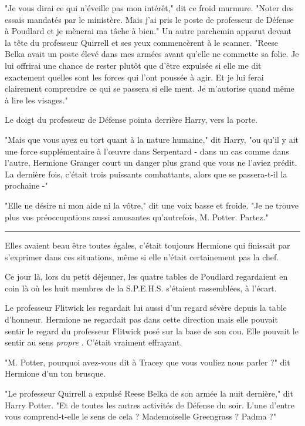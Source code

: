 "Je vous dirai ce qui n'éveille pas mon intérêt," dit ce froid murmure. "Noter des essais mandatés par le ministère. Mais j'ai pris le poste de professeur de Défense à Poudlard et je mènerai ma tâche à bien." Un autre parchemin apparut devant la tête du professeur Quirrell et ses yeux commencèrent à le scanner. "Reese Belka avait un poste élevé dans mes armées avant qu'elle ne commette sa folie. Je lui offrirai une chance de rester plutôt que d'être expulsée si elle me dit exactement quelles sont les forces qui l'ont poussée à agir. Et je lui ferai clairement comprendre ce qui se passera si elle ment. Je m'autorise quand même à lire les visages."

Le doigt du professeur de Défense pointa derrière Harry, vers la porte.

"Mais que vous ayez eu tort quant à la nature humaine," dit Harry, "ou qu'il y ait une force supplémentaire à l'œuvre dans Serpentard - dans un cas comme dans l'autre, Hermione Granger court un danger plus grand que vous ne l'aviez prédit. La dernière fois, c'était trois puissants combattants, alors que se passera-t-il la prochaine -"

"Elle ne désire ni mon aide ni la vôtre," dit une voix basse et froide. "Je ne trouve plus vos préoccupations aussi amusantes qu'autrefois, M. Potter. Partez."
\par\noindent\rule{\textwidth}{0.4pt}
Elles avaient beau être toutes égales, c'était toujours Hermione qui finissait par s'exprimer dans ces situations, même si elle n'était certainement pas la chef.

Ce jour là, lors du petit déjeuner, les quatre tables de Poudlard regardaient en coin là où les huit membres de la S.P.E.H.S. s'étaient rassemblées, à l'écart.

Le professeur Flitwick les regardait lui aussi d'un regard sévère depuis la table d'honneur. Hermione ne regardait pas dans cette direction mais elle pouvait sentir le regard du professeur Flitwick posé sur la base de son cou. Elle pouvait le sentir au sens \emph{propre} . C'était vraiment effrayant.

"M. Potter, pourquoi avez-vous dit à Tracey que vous vouliez nous parler ?" dit Hermione d'un ton brusque.

"Le professeur Quirrell a expulsé Reese Belka de son armée la nuit dernière," dit Harry Potter. "Et de toutes les autres activités de Défense du soir. L'une d'entre vous comprend-t-elle le sens de cela ? Mademoiselle Greengrass ? Padma ?"

